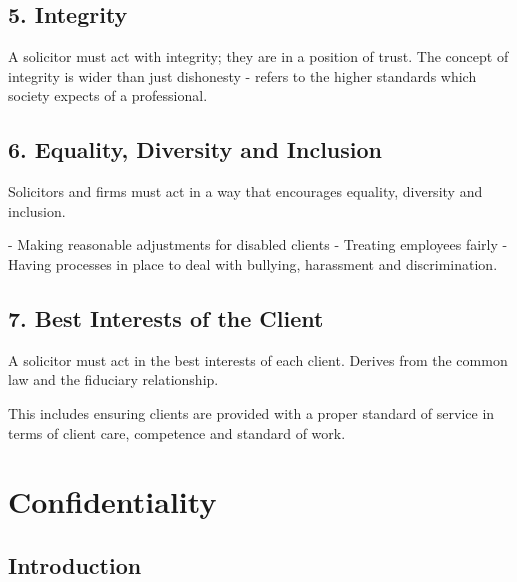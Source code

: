 \documentclass[
]{article}
\newenvironment{Shaded}{}{}
\newcommand{\NormalTok}[1]{#1}
\begin{document}
\hypertarget{integrity}{%
\subsection{5. Integrity}\label{integrity}}

A solicitor must act with integrity; they are in a position of trust.
The concept of integrity is wider than just dishonesty - refers to the
higher standards which society expects of a professional.

\hypertarget{equality-diversity-and-inclusion}{%
\subsection{6. Equality, Diversity and
Inclusion}\label{equality-diversity-and-inclusion}}

Solicitors and firms must act in a way that encourages equality,
diversity and inclusion.

\begin{Shaded}
\begin{Highlighting}[]
\NormalTok{{-} Making reasonable adjustments for disabled clients}
\NormalTok{{-} Treating employees fairly}
\NormalTok{{-} Having processes in place to deal with bullying, harassment and discrimination.}
\end{Highlighting}
\end{Shaded}

\hypertarget{best-interests-of-the-client}{%
\subsection{7. Best Interests of the
Client}\label{best-interests-of-the-client}}

A solicitor must act in the best interests of each client. Derives from
the common law and the fiduciary relationship.

This includes ensuring clients are provided with a proper standard of
service in terms of client care, competence and standard of work.

\hypertarget{confidentiality}{%
\section{Confidentiality}\label{confidentiality}}

\hypertarget{introduction-1}{%
\subsection{Introduction}\label{introduction-1}}
\end{document}
